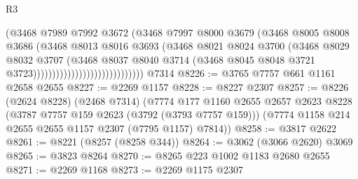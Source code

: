 \begin{lexlean}{R3}
\begin{coremodule}
                                              (@3468
                                                @7989
                                                @7992
                                                @3672
                                                (@3468
                                                  @7997
                                                  @8000
                                                  @3679
                                                  (@3468
                                                    @8005
                                                    @8008
                                                    @3686
                                                    (@3468
                                                      @8013
                                                      @8016
                                                      @3693
                                                      (@3468
                                                        @8021
                                                        @8024
                                                        @3700
                                                        (@3468
                                                          @8029
                                                          @8032
                                                          @3707
                                                          (@3468
                                                            @8037
                                                            @8040
                                                            @3714
                                                            (@3468
                                                              @8045
                                                              @8048
                                                              @3721
                                                              @3723)))))))))))))))))))))))))))))
    @7314
@8226 := @3765 @7757 @661 @1161 @2658 @2655
@8227 := @2269 @1157
@8228 := @8227 @2307
@8257 := @8226
    (@2624 @8228)
    (@2468 @7314)
    (@7774
      @177
      @1160
      @2655
      @2657
      @2623
      @8228
      (@3787 @7757 @159 @2623 (@3792 (@3793 @7757 @159)))
      (@7774 @1158 @214 @2655 @2655 @1157 @2307 (@7795 @1157) @7814))
@8258 := @3817 @2622
@8261 := @8221 (@8257 (@8258 @344))
@8264 := @3062 (@3066 @2620) @3069
@8265 := @3823 @8264
@8270 := @8265 @223 @1002 @1183 @2680 @2655
@8271 := @2269 @1168
@8273 := @2269 @1175 @2307

\end{coremodule}
\end{lexlean}
